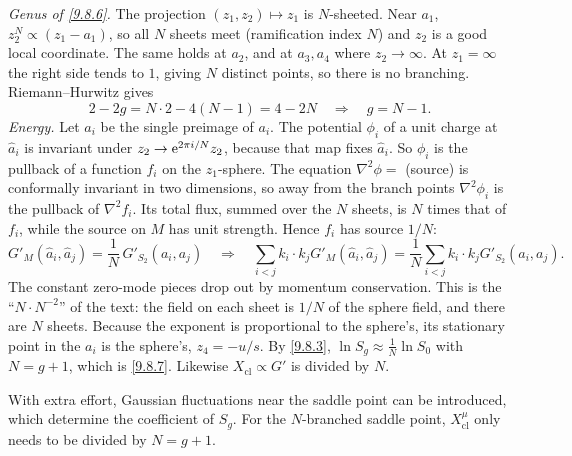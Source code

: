 \begin{tcolorbox}[breakable]
	\begin{remark}
		\emph{Genus of \eqref{9.8.6}.} The projection $(z_1,z_2)\mapsto z_1$ is $N$-sheeted. Near $a_1$, $z_2^N\propto(z_1-a_1)$, so all $N$ sheets meet (ramification index $N$) and $z_2$ is a good local coordinate. The same holds at $a_2$, and at $a_3,a_4$ where $z_2\to\infty$. At $z_1=\infty$ the right side tends to $1$, giving $N$ distinct points, so there is no branching. Riemann--Hurwitz gives
		\begin{equation*}
			2-2g=N\cdot2-4(N-1)=4-2N\quad\Longrightarrow\quad g=N-1 .
		\end{equation*}
		\emph{Energy.} Let $\hat a_i$ be the single preimage of $a_i$. The potential $\phi_i$ of a unit charge at $\hat a_i$ is invariant under $z_2\to\mathrm{e}^{2\pi i/N}z_2$, because that map fixes $\hat a_i$. So $\phi_i$ is the pullback of a function $f_i$ on the $z_1$-sphere. The equation $\nabla^2\phi=$ (source) is conformally invariant in two dimensions, so away from the branch points $\nabla^2\phi_i$ is the pullback of $\nabla^2f_i$. Its total flux, summed over the $N$ sheets, is $N$ times that of $f_i$, while the source on $M$ has unit strength. Hence $f_i$ has source $1/N$:
		\begin{equation*}
			G'_M(\hat a_i,\hat a_j)=\frac1N\,G'_{S_2}(a_i,a_j)\quad\Longrightarrow\quad\sum_{i<j}k_i\cdot k_jG'_M(\hat a_i,\hat a_j)=\frac{1}{N}\sum_{i<j}k_i\cdot k_jG'_{S_2}(a_i,a_j).
		\end{equation*}
		The constant zero-mode pieces drop out by momentum conservation. This is the ``$N\cdot N^{-2}$'' of the text: the field on each sheet is $1/N$ of the sphere field, and there are $N$ sheets. Because the exponent is proportional to the sphere's, its stationary point in the $a_i$ is the sphere's, $z_4=-u/s$. By \eqref{9.8.3}, $\ln S_g\approx\frac{1}{N}\ln S_0$ with $N=g+1$, which is \eqref{9.8.7}. Likewise $X_{\mathrm{cl}}\propto G'$ is divided by $N$.
	\end{remark}
\end{tcolorbox}
With extra effort, Gaussian fluctuations near the saddle point can be introduced, which determine the coefficient of $S_{g}$. For the $N$-branched saddle point, $X_{\mathrm{cl}}^{\mu}$ only needs to be divided by $N=g{+}1$.

